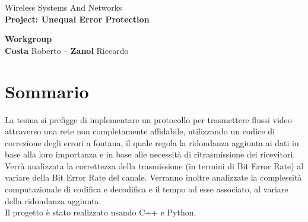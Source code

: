 \documentclass[italian, a4paper, 12pt]{article}
\newcommand{\horline}{\rule{1\linewidth}{0.9pt}}
\begin{document}
\begin{center}
        \Large Wireless Systems And Networks\\
        \huge \textbf{Project: Unequal Error Protection}\\[3mm]
        \begin{framed}
                \Large \textbf{Workgroup} \\[2mm]
                \normalsize \textbf{Costa} Roberto -- \textbf{Zanol} Riccardo
        \end{framed}
\end{center}
\FloatBarrier
\section*{Sommario} %
La tesina si prefigge di implementare un protocollo per trasmettere flussi video attraverso una rete non completamente affidabile, utilizzando un codice di correzione degli errori a fontana, il quale regola la ridondanza aggiunta ai dati in base alla loro importanza e in base alle necessità di ritrasmissione dei ricevitori.
Verrà analizzata la correttezza della trasmissione (in termini di Bit Error Rate) al variare della Bit Error Rate del canale. Verranno inoltre analizzate la complessità computazionale di codifica e decodifica e il tempo ad esse associato, al variare della ridondanza aggiunta.\\
Il progetto è stato realizzato usando C++ e Python.
\newpage
\end{document}
